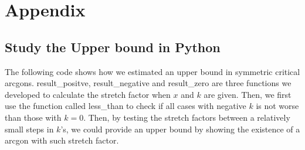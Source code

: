 \chapter{Appendix}
\section{Study the Upper bound in Python}
The following code shows how we estimated an upper bound in symmetric critical arcgons. result\_positve, result\_negative and result\_zero are three functions we developed to calculate the stretch factor when $x$ and $k$ are given. Then, we first use the function called less\_than to check if all cases with negative  $k$ is not worse than those with $k=0$. Then, by testing the stretch factors between a relatively small steps in $k$'s, we could provide an upper bound by showing the existence of a arcgon with such stretch factor.



